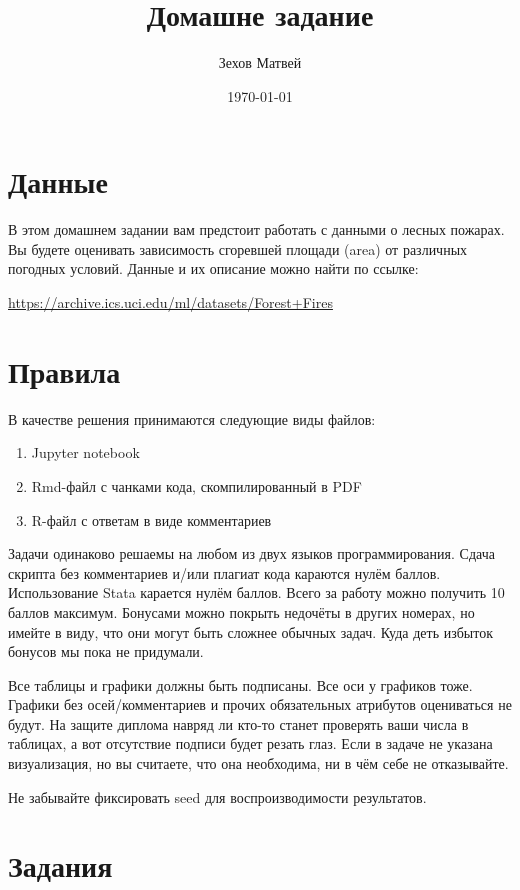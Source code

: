 \documentclass[a4paper,12pt]{article}
\author{Зехов Матвей}
\title{Домашне задание}
\date{\today}
\begin{document}
	\section{Данные}
	
	В этом домашнем задании вам предстоит работать с данными о лесных пожарах. Вы будете оценивать зависимость сгоревшей площади (area) от различных погодных условий. Данные и их описание можно найти по ссылке: 
	
	\href{https://archive.ics.uci.edu/ml/datasets/Forest+Fires}{https://archive.ics.uci.edu/ml/datasets/Forest+Fires}
	
\section{Правила}
	
В качестве решения принимаются следующие виды файлов:
\begin{enumerate}
	\item Jupyter notebook
	\item Rmd-файл с чанками кода, скомпилированный в PDF
	\item R-файл с ответам в виде комментариев
	
\end{enumerate}	

 Задачи одинаково решаемы на любом из двух языков программирования. Сдача скрипта без комментариев и/или плагиат кода караются нулём баллов. Использование Stata карается нулём баллов. Всего за работу можно получить 10 баллов максимум. Бонусами можно покрыть недочёты в других номерах, но имейте в виду, что они могут быть сложнее обычных задач. Куда деть избыток бонусов мы пока не придумали.
	
	Все таблицы и графики должны быть подписаны. Все оси у графиков тоже. Графики без осей/комментариев и прочих обязательных атрибутов оцениваться не будут. На защите диплома навряд ли кто-то станет проверять ваши числа в таблицах, а вот отсутствие подписи будет резать глаз. Если в задаче не указана визуализация, но вы считаете, что она необходима, ни в чём себе не отказывайте. 

Не забывайте фиксировать seed для воспроизводимости результатов.
	
	\section{Задания}
	
\end{document}
